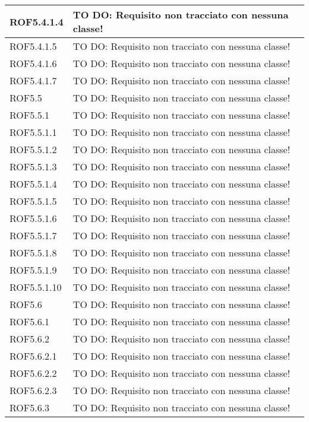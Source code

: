 \begin{center}
\begin{longtable}{| p{2.5cm} | p{11cm} |}
\hline
ROF5.4.1.4 & TO DO: Requisito non tracciato con nessuna classe! \\
\hline
ROF5.4.1.5 & TO DO: Requisito non tracciato con nessuna classe! \\
\hline
ROF5.4.1.6 & TO DO: Requisito non tracciato con nessuna classe! \\
\hline
ROF5.4.1.7 & TO DO: Requisito non tracciato con nessuna classe! \\
\hline
ROF5.5 & TO DO: Requisito non tracciato con nessuna classe! \\
\hline
ROF5.5.1 & TO DO: Requisito non tracciato con nessuna classe! \\
\hline
ROF5.5.1.1 & TO DO: Requisito non tracciato con nessuna classe! \\
\hline
ROF5.5.1.2 & TO DO: Requisito non tracciato con nessuna classe! \\
\hline
ROF5.5.1.3 & TO DO: Requisito non tracciato con nessuna classe! \\
\hline
ROF5.5.1.4 & TO DO: Requisito non tracciato con nessuna classe! \\
\hline
ROF5.5.1.5 & TO DO: Requisito non tracciato con nessuna classe! \\
\hline
ROF5.5.1.6 & TO DO: Requisito non tracciato con nessuna classe! \\
\hline
ROF5.5.1.7 & TO DO: Requisito non tracciato con nessuna classe! \\
\hline
ROF5.5.1.8 & TO DO: Requisito non tracciato con nessuna classe! \\
\hline
ROF5.5.1.9 & TO DO: Requisito non tracciato con nessuna classe! \\
\hline
ROF5.5.1.10 & TO DO: Requisito non tracciato con nessuna classe! \\
\hline
ROF5.6 & TO DO: Requisito non tracciato con nessuna classe! \\
\hline
ROF5.6.1 & TO DO: Requisito non tracciato con nessuna classe! \\
\hline
ROF5.6.2 & TO DO: Requisito non tracciato con nessuna classe! \\
\hline
ROF5.6.2.1 & TO DO: Requisito non tracciato con nessuna classe! \\
\hline
ROF5.6.2.2 & TO DO: Requisito non tracciato con nessuna classe! \\
\hline
ROF5.6.2.3 & TO DO: Requisito non tracciato con nessuna classe! \\
\hline
ROF5.6.3 & TO DO: Requisito non tracciato con nessuna classe! \\

\end{longtable}
\end{center}
